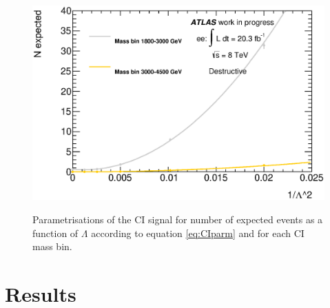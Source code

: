 \begin{figure}[h!]
\begin{center}
	    	\includegraphics[width=0.49\linewidth]{images/parametrisations/NexpFits_plus_elec_himass.eps} \\
	    \end{center}
	   \caption{Parametrisations of the CI signal for number of expected events as a function of $\Lambda$ according to equation \ref{eq:CIparm} and for each CI mass bin.}
	   \label{fig:CIparm}
	\end{figure}



\section{Results}

